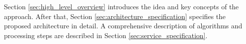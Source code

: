 \documentclass[../../main.tex]{subfiles}
\begin{document}
Section \ref{sec:high_level_overview} introduces the idea and key concepts of the approach. After that, Section \ref{sec:architecture_specification} specifies the proposed architecture in detail. A comprehensive description of algorithms and processing steps are described in Section \ref{sec:service_specification}.






\end{document}

